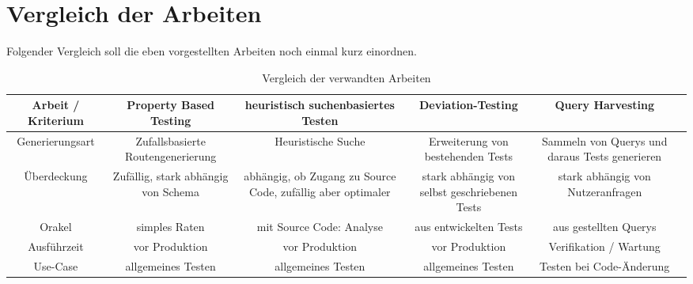 \section{Vergleich der Arbeiten}
Folgender Vergleich soll die eben vorgestellten Arbeiten noch einmal kurz einordnen.
\begin{center}
    \begin{table}[!hbt]
        \begin{tabularx}{\textwidth}{|C|C|C|C|C|C|}
            \hline
            \textbf{ Arbeit / Kriterium} & \textbf{Property Based Testing} & \textbf{heuristisch suchenbasiertes Testen} & \textbf{Deviation-Testing} & \textbf{Query Harvesting} \\
            \hline
            Generierungsart & Zufallsbasierte Routengenerierung & Heuristische Suche & Erweiterung von bestehenden Tests & Sammeln von Querys und daraus Tests generieren \\
            \hline
            Überdeckung & Zufällig, stark abhängig von Schema  & abhängig, ob Zugang zu Source Code, zufällig aber optimaler & stark abhängig von selbst geschriebenen Tests  & stark abhängig von Nutzeranfragen \\
            \hline
            Orakel & simples Raten & mit Source Code: Analyse & aus entwickelten Tests &  aus gestellten Querys \\
            \hline
            Ausführzeit & vor Produktion & vor Produktion & vor Produktion & Verifikation / Wartung \\
            \hline
            Use-Case & allgemeines Testen & allgemeines Testen & allgemeines Testen & Testen bei Code-Änderung \\
            \hline
        \end{tabularx}
        \caption{Vergleich der verwandten Arbeiten}
    \end{table}
\end{center}


